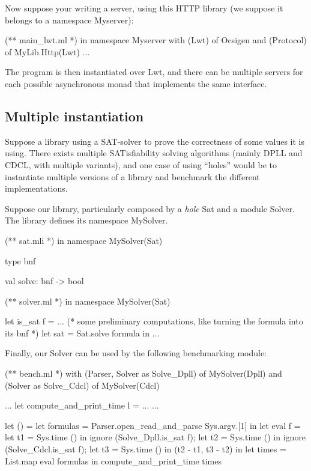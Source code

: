 \documentclass[11pt,a4paper]{article}
\begin{document}
\medskip

Now suppose your writing a server, using this HTTP library (we suppose it belongs
to a namespace Myserver):

\begin{OCaml}
(** main_lwt.ml *)
in namespace Myserver
  with (Lwt) of Ocsigen
  and (Protocol) of MyLib.Http(Lwt)
...
\end{OCaml}

The program is then instantiated over Lwt, and there can be multiple servers for
each possible asynchronous monad that implements the same interface.

\subsection{Multiple instantiation}

Suppose a library using a SAT-solver to prove the correctness of some values it
is using. There exists multiple SATisfiability solving algorithms (mainly DPLL
and CDCL, with multiple variants), and one case of using ``holes'' would be to
instantiate multiple versions of a library and benchmark the different
implementations.

Suppose our library, particularly composed by a \emph{hole} Sat and a module
Solver. The library defines its namespace MySolver.

\begin{OCaml}
(** sat.mli *)
in namespace MySolver(Sat)

type bnf

val solve: bnf -> bool
\end{OCaml}

\medskip 

\begin{OCaml}
(** solver.ml *)
in namespace MySolver(Sat)

let is_sat f =
... 
(* some preliminary computations, like turning the formula into its bnf *)
  let sat = Sat.solve formula in 
...
\end{OCaml}

\medskip

Finally, our Solver can be used by the following benchmarking module:

\begin{OCaml}
(** bench.ml *)
with (Parser, Solver as Solve_Dpll) of MySolver(Dpll)
and (Solver as Solve_Cdcl) of MySolver(Cdcl)

...
let compute_and_print_time l = ...
...

let () =
  let formulas = 
    Parser.open_read_and_parse Sys.argv.[1] in
  let eval f =
    let t1 = Sys.time () in
    ignore (Solve_Dpll.is_sat f);
    let t2 = Sys.time () in
    ignore (Solve_Cdcl.is_sat f);
    let t3 = Sys.time () in
    (t2 - t1, t3 - t2)
  in
  let times = List.map eval formulas in
  compute_and_print_time times
\end{OCaml}
\end{document}
